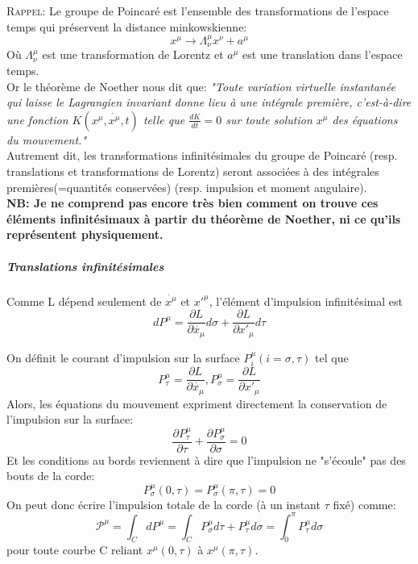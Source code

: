 \documentclass[a4paper,12pt]{article}
\begin{document}
\textsc{Rappel}: Le groupe de Poincaré est l'ensemble des transformations de l'espace temps qui préservent la distance minkowskienne:
$$ x^{\mu}\rightarrow\Lambda_{\nu}^{\mu}x^{\nu}+a^{\mu}$$ 
Où $\Lambda_{\nu}^{\mu}$ est une transformation de Lorentz et $a^{\mu}$ est une translation dans l'espace temps.\\
Or le théorème de Noether nous dit que:
\textit{"Toute variation virtuelle instantanée qui laisse le Lagrangien invariant donne lieu à une intégrale première, c'est-à-dire une fonction $K(x^{\mu},\dot{x^{\mu}},t)$ telle que $\frac{dK}{dt}=0$ sur toute solution $x^{\mu}$ des équations du mouvement."}\\
Autrement dit, les transformations infinitésimales du groupe de Poincaré (resp. translations  et transformations de Lorentz) seront associées à des intégrales premières(=quantités conservées) (resp. impulsion et moment angulaire).\\ 
\textbf{NB: Je ne comprend pas encore très bien comment on trouve ces éléments infinitésimaux à partir du théorème de Noether, ni ce qu'ils représentent physiquement.}
\subparagraph{Translations infinitésimales}
Comme L dépend seulement de $\dot{x^{\mu}}$ et $x'^{\mu}$, 
l'élément d'impulsion infinitésimal est 
$$dP^{\mu}=\frac{\partial L}{\partial \dot{x_{\mu}}}d\sigma+\frac{\partial L}{\partial x'_{\mu}}d\tau$$

On définit le courant d'impulsion sur la surface $P^{\mu}_{i}(i=\sigma,\tau)$ tel que 
$$P^{\mu}_{\tau}=\frac{\partial L}{\partial \dot{x_{\mu}}},			 P^{\mu}_{\sigma}=\frac{\partial L}{\partial x'_{\mu}}$$
Alors, les équations du mouvement expriment directement la conservation de l'impulsion sur la surface:
$$\frac{\partial P^{\mu}_{\tau}}{\partial \tau}+\frac{\partial P^{\mu}_{\sigma}}{\partial \sigma}=0$$
Et les conditions au bords reviennent à dire que l'impulsion ne "s'écoule" pas des bouts de la corde: $$P^{\mu}_{\sigma}(0,\tau)=P^{\mu}_{\sigma}(\pi,\tau)=0$$
On peut donc écrire l'impulsion totale de la corde (à un instant $\tau$ fixé) comme:
$$\mathcal{P^{\mu}}=\int_{C}dP^{\mu}=\int_{C}P^{\mu}_{\sigma}d\tau+P^{\mu}_{\tau}d\sigma=\int_{0}^{\pi}P^{\mu}_{\tau}d\sigma$$
pour toute courbe C reliant $x^{\mu}(0,\tau)$ à $x^{\mu}(\pi,\tau)$.
\end{document}
